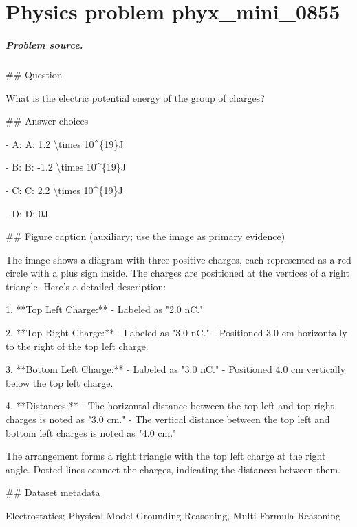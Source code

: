 
\chapter{Physics problem phyx\_mini\_0855}
\label{ch:PhyXMiniProblems_problem_phyx_mini_0855}

\paragraph{Problem source.}
\#\# Question

What is the electric potential energy of the group of charges?

\#\# Answer choices

- A: A: 1.2 \textbackslash{}times 10\textasciicircum{}\{19\}J

- B: B: -1.2 \textbackslash{}times 10\textasciicircum{}\{19\}J

- C: C: 2.2 \textbackslash{}times 10\textasciicircum{}\{19\}J

- D: D: 0J

\#\# Figure caption (auxiliary; use the image as primary evidence)

The image shows a diagram with three positive charges, each represented as a red circle with a plus sign inside. The charges are positioned at the vertices of a right triangle. Here's a detailed description:

1. **Top Left Charge:**
   - Labeled as "2.0 nC."

2. **Top Right Charge:**
   - Labeled as "3.0 nC."
   - Positioned 3.0 cm horizontally to the right of the top left charge.

3. **Bottom Left Charge:**
   - Labeled as "3.0 nC."
   - Positioned 4.0 cm vertically below the top left charge.

4. **Distances:**
   - The horizontal distance between the top left and top right charges is noted as "3.0 cm."
   - The vertical distance between the top left and bottom left charges is noted as "4.0 cm."

The arrangement forms a right triangle with the top left charge at the right angle. Dotted lines connect the charges, indicating the distances between them.

\#\# Dataset metadata

Electrostatics; Physical Model Grounding Reasoning, Multi-Formula Reasoning

